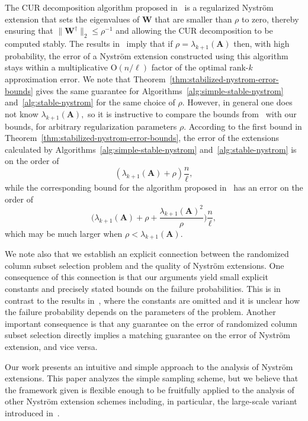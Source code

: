 \documentclass[11pt,letterpaper,twoside,reqno,nosumlimits]{amsart}
\def\pinv{\dagger}
\newcommand{\mat}[1]{\ensuremath{\mathbf{#1}}}
\newcommand{\snorm}[1]{\ensuremath{\big\|#1\big\|_2}}
\theoremstyle{remark}
\begin{document}
The CUR decomposition algorithm proposed in~\cite{CD11} is a regularized Nystr\"om extension that sets the eigenvalues of $\mat{W}$ that are smaller than $\rho$ to zero, thereby ensuring that $\snorm{\mat{W}^\pinv} \leq \rho^{-1}$ and allowing the CUR decomposition to be computed stably. The results in~\cite{CD11} imply that if $\rho = \lambda_{k+1}(\mat{A})$ then, with high probability, the error of a Nystr\"om extension constructed using this algorithm stays within a multiplicative $\mathrm{O}(n/\ell)$ factor of the optimal rank-$k$ approximation error. We note that Theorem~\ref{thm:stabilized-nystrom-error-bounds} gives the same guarantee for Algorithms~\ref{alg:simple-stable-nystrom} and~\ref{alg:stable-nystrom} for the same choice of $\rho.$ However, in general one does not know $\lambda_{k+1}(\mat{A}),$ so it is instructive to compare the bounds from~\cite{CD11} with our bounds, for arbitrary regularization parameters $\rho.$ According to the first bound in Theorem~\ref{thm:stabilized-nystrom-error-bounds}, the error of the extensions 
calculated by Algorithms~\ref{alg:simple-stable-nystrom} and~\ref{alg:stable-nystrom} is on the order of
\[
 (\lambda_{k+1}(\mat{A}) + \rho)\frac{n}{\ell},
\]
while the corresponding bound for the algorithm proposed in~\cite{CD11} has an error on the order of
\[
 \bigg(\lambda_{k+1}(\mat{A}) + \rho + \frac{\lambda_{k+1}(\mat{A})^2}{\rho}\bigg)\frac{n}{\ell},
\]
which may be much larger when $\rho < \lambda_{k+1}(\mat{A}).$

We note also that we establish an explicit connection between the randomized column subset selection problem and the quality of Nystr\"om extensions. One consequence of this connection is that our arguments yield small explicit constants and precisely stated bounds on the failure probabilities. This is in contrast to the results in~\cite{CD11}, where the constants are omitted and it is unclear how the failure probability depends on the parameters of the problem. Another important consequence is that any guarantee on the error of randomized column subset selection directly implies a matching guarantee on the error of Nystr\"om extension, and vice versa.

Our work presents an intuitive and simple approach to the analysis of Nystr\"om extensions. This paper analyzes the simple sampling scheme, but we believe that the framework given is flexible enough to be fruitfully applied to the analysis of other Nystr\"om extension schemes including, in particular, the large-scale variant introduced in~\cite{KLL10}.
\end{document}
